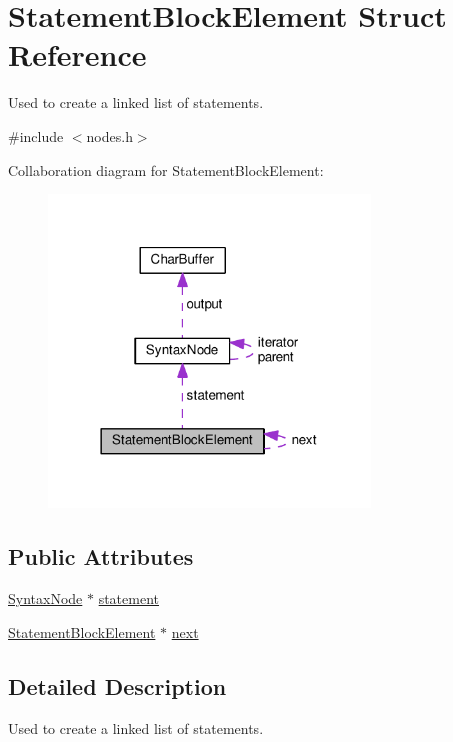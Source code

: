 \hypertarget{structStatementBlockElement}{}\section{Statement\+Block\+Element Struct Reference}
\label{structStatementBlockElement}


Used to create a linked list of statements.  




{\ttfamily \#include $<$nodes.\+h$>$}



Collaboration diagram for Statement\+Block\+Element\+:
\nopagebreak
\begin{figure}[H]
\begin{center}
\leavevmode
\includegraphics[width=242pt]{d0/d5e/structStatementBlockElement__coll__graph}
\end{center}
\end{figure}
\subsection*{Public Attributes}
\begin{DoxyCompactItemize}
\item 
\hyperlink{classSyntaxNode}{Syntax\+Node} $\ast$ \hyperlink{structStatementBlockElement_a9ac07a402a18f927cb895cdbd86d6a06}{statement}
\item 
\hyperlink{structStatementBlockElement}{Statement\+Block\+Element} $\ast$ \hyperlink{structStatementBlockElement_aa6001c0b1578810f85004ae397da2387}{next}
\end{DoxyCompactItemize}


\subsection{Detailed Description}
Used to create a linked list of statements. 


